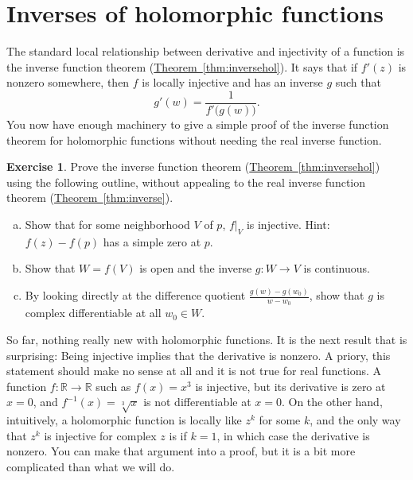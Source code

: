 \documentclass[12pt,openany]{book}
\newcommand{\R}{{\mathbb{R}}}
\theoremstyle{plain}
\theoremstyle{remark}
\theoremstyle{definition}
\newenvironment{exbox}{%
    \def\FrameCommand{\vrule width 1pt \relax\hspace{10pt}}%
    \MakeFramed{\advance\hsize-\width\FrameRestore}%
}{%
    \endMakeFramed
}
\newenvironment{exparts}{%
    \leavevmode\begin{enumerate}[a),noitemsep,topsep=0pt,parsep=0pt,partopsep=0pt]
}{%
    \end{enumerate}
}
\theoremstyle{exercise}
\newtheorem{exercise}{Exercise}[section]
\theoremstyle{example}
\newcommand{\thmref}[1]{\hyperref[#1]{Theorem~\ref*{#1}}}
\begin{document}
\section{Inverses of holomorphic functions} \label{sec:inverses}

The standard local relationship between derivative and injectivity of a
function is the inverse function theorem (\thmref{thm:inversehol}).
It says that if $f'(z)$ is nonzero somewhere, then $f$ is locally
injective and has an inverse $g$ such that
\begin{equation*}
g'(w) = \frac{1}{f'\bigl(g(w)\bigr)} .
\end{equation*}
You now have enough machinery to give a simple proof
of the inverse function theorem for holomorphic functions
without needing the real inverse function.

\begin{exbox}
\begin{exercise}
Prove the inverse function theorem (\thmref{thm:inversehol})
using the following outline, without appealing to the real inverse function
theorem (\thmref{thm:inverse}).
\begin{exparts}
\item Show that for some neighborhood $V$ of $p$, $f|_V$ is injective.
Hint: $f(z)-f(p)$ has a simple zero at $p$.
\item Show that $W = f(V)$ is open and the inverse $g \colon W \to V$ is
continuous.
\item By looking directly at the difference quotient
$\frac{g(w)-g(w_0)}{w-w_0}$,
show that $g$ is complex differentiable at all $w_0 \in W$.
\end{exparts}
\end{exercise}
\end{exbox}

So far, nothing really new with holomorphic functions.
It is the next
result that is surprising: Being injective
implies that the derivative is nonzero.
A priory, this statement should make no sense at all and it is not true for real functions.
A function $f \colon \R \to \R$ such as $f(x) = x^3$
is injective, but its derivative is zero at $x=0$, and $f^{-1}(x) =
\sqrt[3]{x}$ is not differentiable at $x=0$.
On the other hand, intuitively, a holomorphic function is
locally like $z^k$ for some $k$, and the only way that $z^k$ is injective
for complex $z$ is
if $k=1$, in which case the derivative is nonzero.
You can make that
argument into a proof, but it is a bit more complicated than what we will do.
\end{document}

